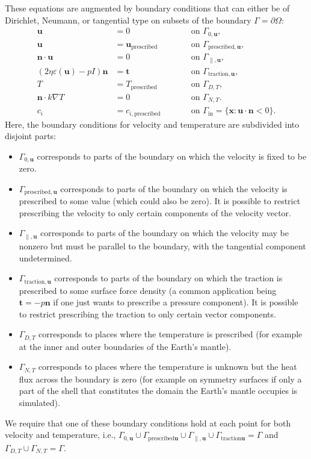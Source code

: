 \documentclass{article}
\begin{document}
These equations are
augmented by boundary conditions that can either be of Dirichlet, Neumann, or
tangential type on subsets of the boundary $\Gamma=\partial\Omega$:
\begin{align}
  \mathbf u &= 0 & \qquad &\textrm{on $\Gamma_{0,\mathbf u}$},
  \\
  \mathbf u &= \mathbf u_{\text{prescribed}} & \qquad &\textrm{on
  $\Gamma_{\text{prescribed},\mathbf u}$},
  \\
  \mathbf n \cdot \mathbf u &= 0 & \qquad &\textrm{on $\Gamma_{\parallel,\mathbf
  u}$},
  \\
  (2\eta \varepsilon(\mathbf u) -p I)\mathbf n  &= \mathbf t & \qquad
  &\textrm{on $\Gamma_{\text{traction},\mathbf u}$},
  \\
  T &= T_{\text{prescribed}}
   & \qquad &\textrm{on $\Gamma_{D,T}$},
  \\
  \mathbf n \cdot k\nabla T &= 0
   & \qquad &\textrm{on $\Gamma_{N,T}$}.
  \\
  \label{eq:gamma-in-composition}
  c_i &= c_{i,\text{prescribed}}
   & \qquad &\textrm{on $\Gamma_{\text{in}}=\{\mathbf x: \mathbf
   u\cdot\mathbf n<0\}$}.
\end{align}
Here, the boundary conditions for velocity and temperature are subdivided into
disjoint parts:
\begin{itemize}
  \item $\Gamma_{0,\mathbf u}$ corresponds to parts of the boundary on
which the velocity is fixed to be zero.
  \item $\Gamma_{\text{prescribed},\mathbf u}$ corresponds to parts of the
  boundary on which the velocity is prescribed to some value (which could also
  be zero). It is possible to restrict prescribing the velocity to only certain
  components of the velocity vector.
  \item $\Gamma_{\parallel,\mathbf u}$ corresponds to parts of the boundary on
  which the velocity may be nonzero but must be parallel to the boundary, with the
tangential component undetermined.
  \item $\Gamma_{\text{traction},\mathbf u}$ corresponds to parts of the
  boundary on which the traction is prescribed to some surface force density (a
  common application being $\mathbf t=-p\mathbf n$ if one
  just wants to prescribe a pressure component). It is possible to restrict
  prescribing the traction to only certain vector components.
  \item $\Gamma_{D,T}$ corresponds to places where the temperature is prescribed
  (for example at the inner and outer boundaries of the Earth's mantle).
  \item $\Gamma_{N,T}$ corresponds to places where the temperature is unknown
  but the heat flux across the boundary is zero (for example on symmetry surfaces if only a part
of the shell that constitutes the domain the Earth's mantle occupies is
simulated).
\end{itemize}
We require that one of these boundary conditions hold at each
point for both velocity and temperature, i.e.,
$\Gamma_{0,\mathbf u}\cup\Gamma_{{\text{prescribed}}\mathbf
  u}\cup\Gamma_{\parallel,\mathbf u}\cup\Gamma_{{\text{traction}}\mathbf
  u}=\Gamma$ and
$\Gamma_{D,T}\cup\Gamma_{N,T}=\Gamma$. 
\end{document}

